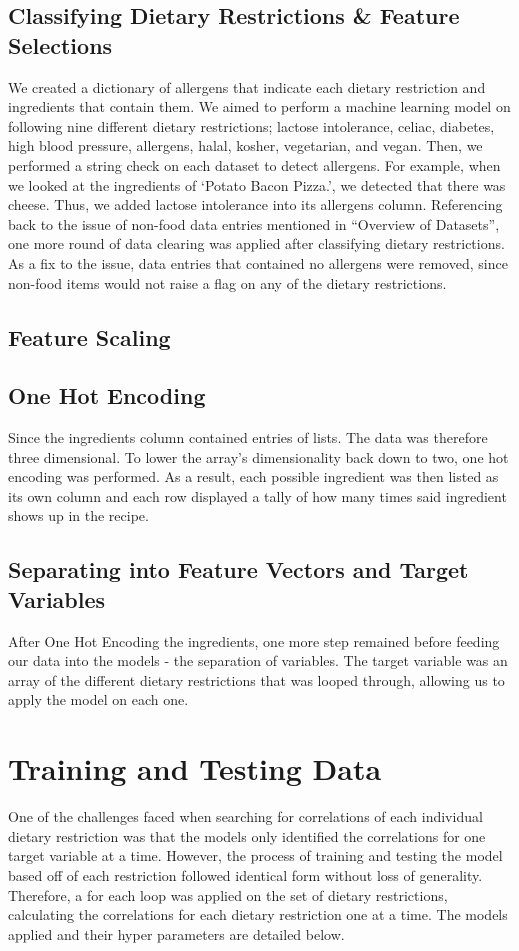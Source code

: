 \documentclass[twocolumn]{article}
\begin{document}
\subsection{Classifying Dietary Restrictions & Feature Selections}
 We created a dictionary of allergens that indicate each dietary restriction and ingredients that contain them. We aimed to perform a machine learning model on following nine different dietary restrictions; lactose intolerance, celiac, diabetes, high blood pressure, allergens, halal, kosher, vegetarian, and vegan. Then, we performed a string check on each dataset to detect allergens. For example, when we looked at the ingredients of ‘Potato Bacon Pizza.’, we detected that there was cheese. Thus, we added lactose intolerance into its allergens column. Referencing back to the issue of non-food data entries mentioned in “Overview of Datasets”, one more round of data clearing was applied after classifying dietary restrictions. As a fix to the issue, data entries that contained no allergens were removed, since non-food items would not raise a flag on any of the dietary restrictions. 
\subsection{Feature Scaling}
\subsection{One Hot Encoding}
Since the ingredients column contained entries of lists. The data was therefore three dimensional. To lower the array's dimensionality back down to two, one hot encoding was performed. As a result, each possible ingredient was then listed as its own column and each row displayed a tally of how many times said ingredient shows up in the recipe.
\subsection{Separating into Feature Vectors and Target Variables}
After One Hot Encoding the ingredients, one more step remained before feeding our data into the models - the separation of variables. The target variable was an array of the different dietary restrictions that was looped through, allowing us to apply the model on each one. 
\section{Training and Testing Data}
One of the challenges faced when searching for correlations of each individual dietary restriction was that the models only identified the correlations for one target variable at a time. However, the process of training and testing the model based off of each restriction followed identical form without loss of generality. Therefore, a for each loop was applied on the set of dietary restrictions, calculating the correlations for each dietary restriction one at a time. The models applied and their hyper parameters are detailed below.
\end{document}
